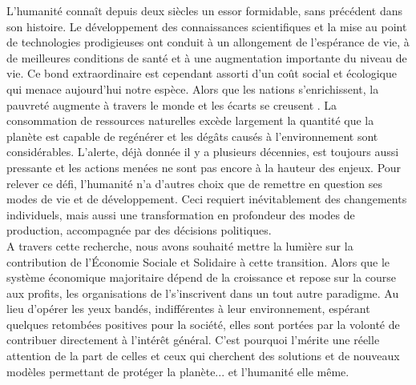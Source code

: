 L'humanité connaît depuis deux siècles un essor formidable, sans précédent dans son histoire. Le développement des connaissances scientifiques et la mise au point  de technologies prodigieuses ont conduit à un allongement de l'espérance de vie, à de meilleures conditions de santé et à une augmentation importante du niveau de vie. Ce bond extraordinaire est cependant assorti d'un coût social et écologique qui menace aujourd'hui notre espèce. Alors que les nations s'enrichissent, la pauvreté augmente à travers le monde et les écarts se creusent \parencite{lange2018changing}.  La consommation de ressources naturelles excède largement la quantité que la planète est capable de regénérer et les dégâts causés à l'environnement sont considérables. L'alerte, déjà donnée il y a plusieurs décennies, est toujours aussi pressante et les actions menées ne sont pas encore à la hauteur des enjeux. Pour relever ce défi, l'humanité n'a d'autres choix que de remettre en question ses modes de vie et de développement. Ceci requiert inévitablement des changements individuels, mais aussi une transformation en profondeur des modes de production, accompagnée par des décisions politiques. \\

A travers cette recherche, nous avons souhaité mettre la lumière sur la contribution de l'Économie Sociale et Solidaire à cette transition. Alors que le système économique majoritaire dépend de la croissance et repose sur la course aux profits, les organisations de l'\ess s'inscrivent dans un tout autre paradigme. Au lieu d'opérer les yeux bandés, indifférentes à leur environnement, espérant quelques retombées positives pour la société, elles sont portées par la volonté de contribuer directement à l'intérêt général. C'est pourquoi l'\ess mérite une réelle attention de la part de celles et ceux qui cherchent des solutions et de nouveaux modèles permettant de protéger la planète... et l'humanité elle même. \\

